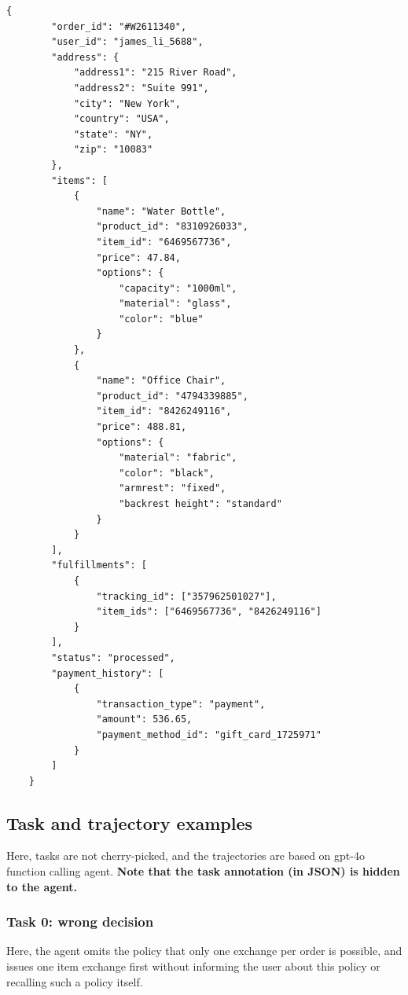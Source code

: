 \begin{listing}[ht]
\begin{verbatim}
{
        "order_id": "#W2611340",
        "user_id": "james_li_5688",
        "address": {
            "address1": "215 River Road",
            "address2": "Suite 991",
            "city": "New York",
            "country": "USA",
            "state": "NY",
            "zip": "10083"
        },
        "items": [
            {
                "name": "Water Bottle",
                "product_id": "8310926033",
                "item_id": "6469567736",
                "price": 47.84,
                "options": {
                    "capacity": "1000ml",
                    "material": "glass",
                    "color": "blue"
                }
            },
            {
                "name": "Office Chair",
                "product_id": "4794339885",
                "item_id": "8426249116",
                "price": 488.81,
                "options": {
                    "material": "fabric",
                    "color": "black",
                    "armrest": "fixed",
                    "backrest height": "standard"
                }
            }
        ],
        "fulfillments": [
            {
                "tracking_id": ["357962501027"],
                "item_ids": ["6469567736", "8426249116"]
            }
        ],
        "status": "processed",
        "payment_history": [
            {
                "transaction_type": "payment",
                "amount": 536.65,
                "payment_method_id": "gift_card_1725971"
            }
        ]
    }
\end{verbatim}
\caption{An example entry from orders database in \retail.}
\end{listing}

\newpage
\clearpage

\subsection{Task and trajectory examples}
\label{sec:retail_trajs}

Here, tasks are not cherry-picked, and the trajectories are based on gpt-4o function calling agent. \textbf{Note that the task annotation (in JSON) is hidden to the agent.}

\subsubsection{Task 0: wrong decision} \label{sec:wrong_decision}
Here, the agent omits the policy that only one exchange per order is possible, and issues one item exchange first without informing the user about this policy or recalling such a policy itself. 

